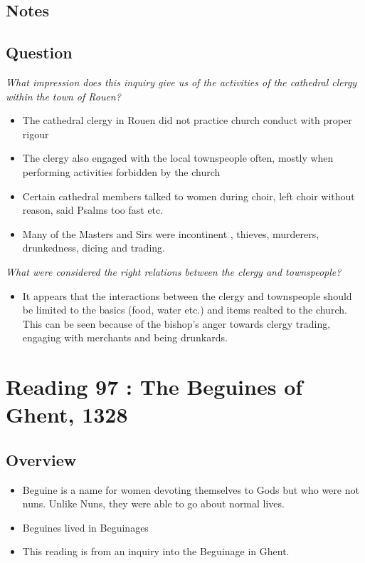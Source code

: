 \documentclass[12pt]{article}
\begin{document}
{\subsection*{Notes}

\subsection*{Question}

\textit{What impression does this inquiry give us of the activities of the cathedral clergy within the town of Rouen?}

\begin{itemize}
	\item The cathedral clergy in Rouen did not practice church conduct with proper rigour
	\item The clergy also engaged with the local townspeople often, mostly when performing activities forbidden by the church
	\item Certain cathedral members talked to women during choir, left choir without reason, said Psalms too fast etc.
	\item Many of the Masters and Sirs were incontinent , thieves, murderers, drunkedness, dicing and trading. 
\end{itemize}

\textit{What were considered the right relations between the clergy and townspeople?}
\begin{itemize}
	\item It appears that the interactions between the clergy and townspeople should be limited to the basics (food, water etc.) and items realted to the church. This can be seen because of the bishop's anger towards clergy trading, engaging with merchants and being drunkards.
\end{itemize}

\section*{Reading 97 : The Beguines of Ghent, 1328}

\subsection*{Overview}
\begin{itemize}
	\item Beguine is a name for women devoting themselves to Gods but who were not nuns. Unlike Nuns, they were able to go about normal lives.
	\item Beguines lived in Beguinages
	\item This reading is from an inquiry into the Beguinage in Ghent.
\end{itemize}

}
\end{document}
